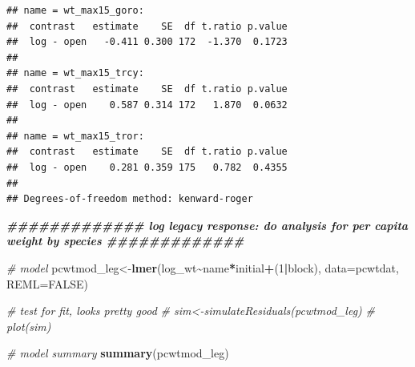 \documentclass[
]{article}
\newenvironment{Shaded}{\begin{snugshade}}{\end{snugshade}}
\newcommand{\AttributeTok}[1]{\textcolor[rgb]{0.13,0.29,0.53}{#1}}
\newcommand{\CommentTok}[1]{\textcolor[rgb]{0.56,0.35,0.01}{\textit{#1}}}
\newcommand{\ConstantTok}[1]{\textcolor[rgb]{0.56,0.35,0.01}{#1}}
\newcommand{\DecValTok}[1]{\textcolor[rgb]{0.00,0.00,0.81}{#1}}
\newcommand{\DocumentationTok}[1]{\textcolor[rgb]{0.56,0.35,0.01}{\textbf{\textit{#1}}}}
\newcommand{\FunctionTok}[1]{\textcolor[rgb]{0.13,0.29,0.53}{\textbf{#1}}}
\newcommand{\NormalTok}[1]{#1}
\newcommand{\OtherTok}[1]{\textcolor[rgb]{0.56,0.35,0.01}{#1}}
\newcommand{\SpecialCharTok}[1]{\textcolor[rgb]{0.81,0.36,0.00}{\textbf{#1}}}
\begin{document}
\begin{verbatim}
## name = wt_max15_goro:
##  contrast   estimate    SE  df t.ratio p.value
##  log - open   -0.411 0.300 172  -1.370  0.1723
## 
## name = wt_max15_trcy:
##  contrast   estimate    SE  df t.ratio p.value
##  log - open    0.587 0.314 172   1.870  0.0632
## 
## name = wt_max15_tror:
##  contrast   estimate    SE  df t.ratio p.value
##  log - open    0.281 0.359 175   0.782  0.4355
## 
## Degrees-of-freedom method: kenward-roger
\end{verbatim}

\begin{Shaded}
\begin{Highlighting}[]
\DocumentationTok{\#\#\#\#\#\#\#\#\#\#\#\#\# log legacy response: do analysis for per capita weight by species \#\#\#\#\#\#\#\#\#\#\#\#\# }

\CommentTok{\# model}
\NormalTok{pcwtmod\_leg}\OtherTok{\textless{}{-}}\FunctionTok{lmer}\NormalTok{(log\_wt}\SpecialCharTok{\textasciitilde{}}\NormalTok{name}\SpecialCharTok{*}\NormalTok{initial}\SpecialCharTok{+}\NormalTok{(}\DecValTok{1}\SpecialCharTok{|}\NormalTok{block), }\AttributeTok{data=}\NormalTok{pcwtdat, }\AttributeTok{REML=}\ConstantTok{FALSE}\NormalTok{)}

\CommentTok{\# test for fit, looks pretty good}
\CommentTok{\# sim\textless{}{-}simulateResiduals(pcwtmod\_leg)}
\CommentTok{\# plot(sim)}

\CommentTok{\# model summary}
\FunctionTok{summary}\NormalTok{(pcwtmod\_leg)}
\end{Highlighting}
\end{Shaded}
\end{document}
